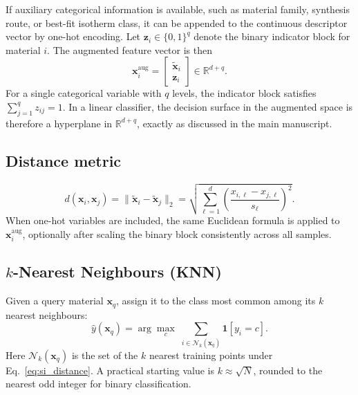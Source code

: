 \documentclass[journal=aamick,manuscript=article]{achemso}
\begin{document}
If auxiliary categorical information is available, such as material
family, synthesis route, or best-fit isotherm class, it can be appended
to the continuous descriptor vector by one-hot encoding. Let
$\mathbf{z}_i \in \{0,1\}^{q}$ denote the binary indicator block for
material $i$. The augmented feature vector is then
\begin{equation}
	\mathbf{x}_i^{\mathrm{aug}}
	=
	\begin{bmatrix}
	\tilde{\mathbf{x}}_i\\
	\mathbf{z}_i
	\end{bmatrix}
	\in \mathbb{R}^{d+q}.
	\label{eq:si_onehot}
\end{equation}
For a single categorical variable with $q$ levels, the indicator block
satisfies $\sum_{j=1}^{q} z_{ij} = 1$. In a linear classifier, the
decision surface in the augmented space is therefore a hyperplane in
$\mathbb{R}^{d+q}$, exactly as discussed in the main manuscript.

\subsection{Distance metric}
\label{sec:si_distance_metric}
\begin{equation}
	d(\mathbf{x}_i, \mathbf{x}_j)
	= \|\tilde{\mathbf{x}}_i - \tilde{\mathbf{x}}_j\|_2
	= \sqrt{\sum_{\ell=1}^{d}
		\left(\frac{x_{i,\ell} - x_{j,\ell}}{s_\ell}\right)^{\!2}}.
	\label{eq:si_distance}
\end{equation}
When one-hot variables are included, the same Euclidean formula is
applied to $\mathbf{x}_i^{\mathrm{aug}}$, optionally after scaling the
binary block consistently across all samples.

\subsection{$k$-Nearest Neighbours (KNN)}
\label{sec:si_KNN}

Given a query material $\mathbf{x}_q$, assign it to the class
most common among its $k$ nearest neighbours:
\begin{equation}
	\hat{y}(\mathbf{x}_q)
	= \arg\max_{c}\;
	\sum_{i \in \mathcal{N}_k(\mathbf{x}_q)} \mathbf{1}[y_i = c].
	\label{eq:si_KNN}
\end{equation}
Here $\mathcal{N}_k(\mathbf{x}_q)$ is the set of the $k$ nearest
training points under Eq.~\eqref{eq:si_distance}. A practical starting
value is $k \approx \sqrt{N}$, rounded to the nearest odd integer for
binary classification.
\end{document}
